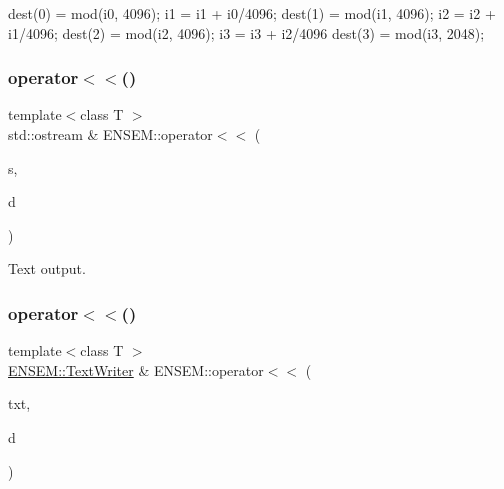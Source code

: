 dest(0) = mod(i0, 4096); i1 = i1 + i0/4096; dest(1) = mod(i1, 4096); i2 = i2 + i1/4096; dest(2) = mod(i2, 4096); i3 = i3 + i2/4096 dest(3) = mod(i3, 2048); \mbox{\label{group__primseed_ga63a0cabc9de5d7af797139dcbe08c7eb}} 
\subsubsection{\texorpdfstring{operator$<$$<$()}{operator<<()}\hspace{0.1cm}{\footnotesize\ttfamily [1/4]}}
{\footnotesize\ttfamily template$<$class T $>$ \\
std\+::ostream \& E\+N\+S\+E\+M\+::operator$<$$<$ (\begin{DoxyParamCaption}\item[{std\+::ostream \&}]{s,  }\item[{const \mbox{\hyperlink{classENSEM_1_1PSeed}{P\+Seed}}$<$ T $>$ \&}]{d }\end{DoxyParamCaption})\hspace{0.3cm}{\ttfamily [inline]}}



Text output. 

\mbox{\label{group__primseed_ga297984102d54c010e9c54ca03f4f8151}} 
\subsubsection{\texorpdfstring{operator$<$$<$()}{operator<<()}\hspace{0.1cm}{\footnotesize\ttfamily [2/4]}}
{\footnotesize\ttfamily template$<$class T $>$ \\
\mbox{\hyperlink{classENSEM_1_1TextWriter}{E\+N\+S\+E\+M\+::\+Text\+Writer}} \& E\+N\+S\+E\+M\+::operator$<$$<$ (\begin{DoxyParamCaption}\item[{\mbox{\hyperlink{classENSEM_1_1TextWriter}{E\+N\+S\+E\+M\+::\+Text\+Writer}} \&}]{txt,  }\item[{const \mbox{\hyperlink{classENSEM_1_1PSeed}{P\+Seed}}$<$ T $>$ \&}]{d }\end{DoxyParamCaption})\hspace{0.3cm}{\ttfamily [inline]}}



